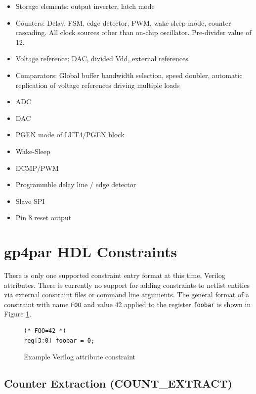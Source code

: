\documentclass[11pt]{article}
\begin{document}
\begin{itemize}
\item Storage elements: output inverter, latch mode
\item Counters: Delay, FSM, edge detector, PWM, wake-sleep mode, counter cascading.
All clock sources other than on-chip oscillator. Pre-divider value of 12.
\item Voltage reference: DAC, divided Vdd, external references
\item Comparators: Global buffer bandwidth selection, speed doubler, 
automatic replication of voltage references driving multiple loads
\item ADC
\item DAC
\item PGEN mode of LUT4/PGEN block
\item Wake-Sleep
\item DCMP/PWM
\item Programmble delay line / edge detector
\item Slave SPI
\item Pin 8 reset output
\end{itemize}

\pagebreak
\section{gp4par HDL Constraints}

There is only one supported constraint entry format at this time, Verilog attributes. There is currently no support for 
adding constraints to netlist entities via external constraint files or command line arguments. The general format of a 
constraint with name \texttt{FOO} and value 42 applied to the register \texttt{foobar} is shown in Figure 
\ref{constraint}.

\begin{figure}[h]
\begin{lstlisting}
(* FOO=42 *)
reg[3:0] foobar = 0;
\end{lstlisting}
\caption{Example Verilog attribute constraint}
\label{constraint}
\end{figure}


\pagebreak
\subsection{Counter Extraction (COUNT\_EXTRACT)}
\label{count-extract}
\end{document}
